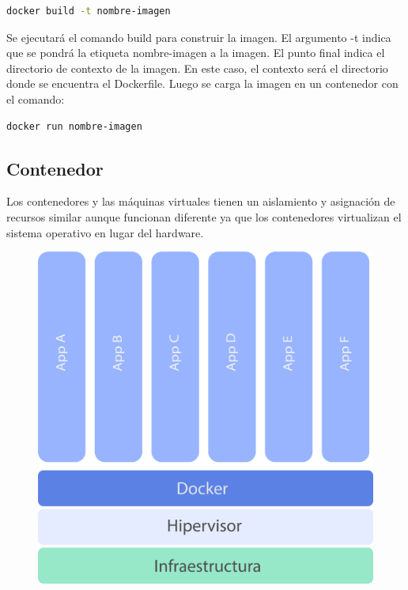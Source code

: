 \begin{lstlisting}[language=bash]
    docker build -t nombre-imagen
\end{lstlisting}

Se ejecutará el comando build para construir la imagen. El argumento -t indica que se pondrá la etiqueta nombre-imagen a la imagen. El punto final indica el directorio de contexto de la imagen. En este caso, el contexto será el directorio donde se encuentra el Dockerfile.
Luego se carga la imagen en un contenedor con el comando:

\begin{lstlisting}[language=bash]
    docker run nombre-imagen
\end{lstlisting}


\subsection[Contenedor]{Contenedor}

Los contenedores y las máquinas virtuales tienen un aislamiento y asignación de recursos similar aunque funcionan diferente ya que los contenedores virtualizan el sistema operativo en lugar del hardware.

\begin{figure}[h!]
  \centering
    \includegraphics[scale=0.7]{images/containers.png}
  \label{fig:contvm}
\end{figure}

